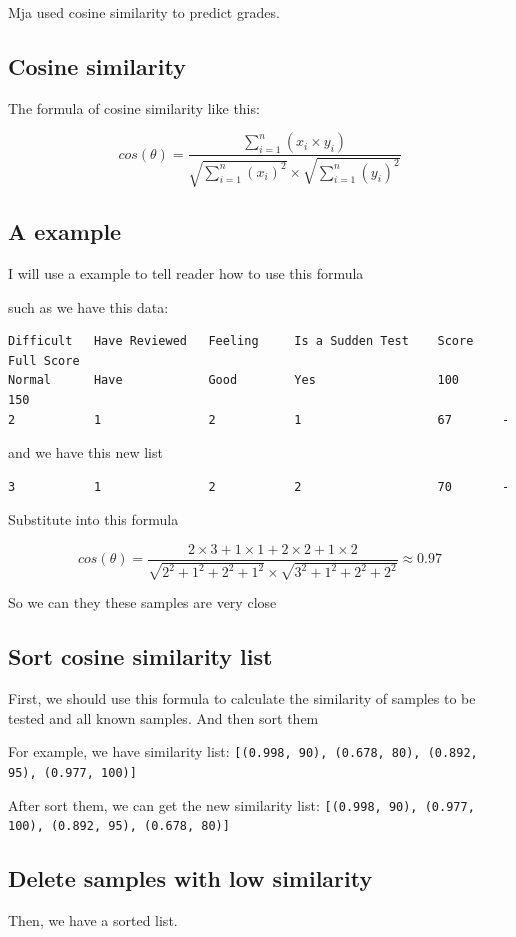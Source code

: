 \documentclass{article}
\begin{document}
Mja used cosine similarity to predict grades.
\subsection{Cosine similarity}
The formula of cosine similarity like this:

\begin{equation}
cos(\theta) = \frac{\sum_{i=1}^{n} (x_i \times y_i)}{{\sqrt{\sum_{i=1}^{n} (x_i)^2}} \times {\sqrt{\sum_{i=1}^{n} (y_i)^2}}}
\end{equation}
\subsection{A example}
I will use a example to tell reader how to use 
this formula


such as we have this data:
\begin{verbatim}
Difficult   Have Reviewed   Feeling     Is a Sudden Test    Score    Full Score
Normal      Have            Good        Yes                 100      150
2           1               2           1                   67       -
\end{verbatim}

and we have this new list
\begin{verbatim}
3           1               2           2                   70       -
\end{verbatim}

Substitute into this formula

\begin{equation}
cos(\theta) = \frac{2 \times 3 + 
1 \times 1 + 2 \times 2 + 1 \times 2}{\sqrt{2^2
+ 1^2 + 2^2 + 1^2} \times \sqrt{3^2 + 1^2 + 2^2 +2^2}}
 \approx 0.97
\end{equation}

So we can they these samples are very close
\subsection{Sort cosine similarity list}
First, we should use this formula to 
calculate the similarity of samples to
 be tested and all known samples. And then sort them 


For example, we have similarity list:
\verb|[(0.998, 90), (0.678, 80), (0.892, 95), (0.977, 100)]|


After sort them, we can get the new similarity list:
\verb|[(0.998, 90), (0.977, 100), (0.892, 95), (0.678, 80)]|

\subsection{Delete samples with low similarity}
Then, we have a sorted list.
\end{document}
